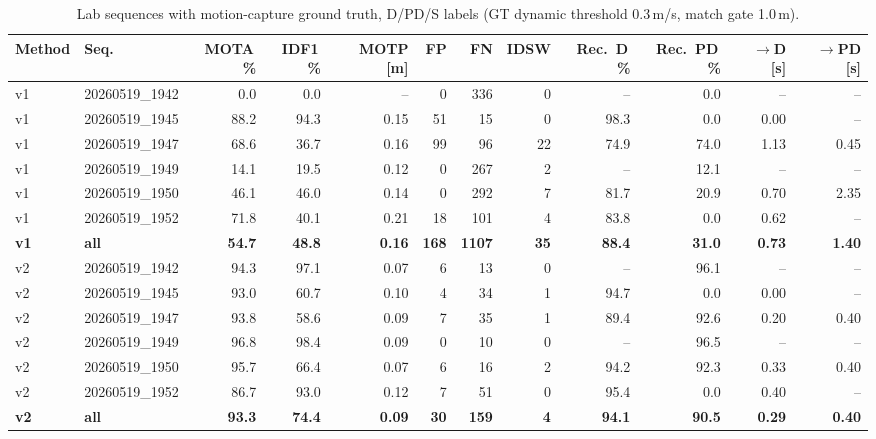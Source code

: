 \begin{table}[t]
\centering
\caption{Lab sequences with motion-capture ground truth, D/PD/S labels (GT dynamic threshold 0.3\,m/s, match gate 1.0\,m).}
\label{tab:own_mocap_full}
\setlength{\tabcolsep}{3pt}
\begin{tabular}{llrrrrrrrrrr}
\toprule
Method & Seq. & MOTA\,\% & IDF1\,\% & MOTP [m] & FP & FN & IDSW & Rec.\ D\,\% & Rec.\ PD\,\% & $\to$D [s] & $\to$PD [s] \\
\midrule
v1 & 20260519\_1942 & 0.0 & 0.0 & -- & 0 & 336 & 0 & -- & 0.0 & -- & -- \\
v1 & 20260519\_1945 & 88.2 & 94.3 & 0.15 & 51 & 15 & 0 & 98.3 & 0.0 & 0.00 & -- \\
v1 & 20260519\_1947 & 68.6 & 36.7 & 0.16 & 99 & 96 & 22 & 74.9 & 74.0 & 1.13 & 0.45 \\
v1 & 20260519\_1949 & 14.1 & 19.5 & 0.12 & 0 & 267 & 2 & -- & 12.1 & -- & -- \\
v1 & 20260519\_1950 & 46.1 & 46.0 & 0.14 & 0 & 292 & 7 & 81.7 & 20.9 & 0.70 & 2.35 \\
v1 & 20260519\_1952 & 71.8 & 40.1 & 0.21 & 18 & 101 & 4 & 83.8 & 0.0 & 0.62 & -- \\
\textbf{v1} & \textbf{all} & \textbf{54.7} & \textbf{48.8} & \textbf{0.16} & \textbf{168} & \textbf{1107} & \textbf{35} & \textbf{88.4} & \textbf{31.0} & \textbf{0.73} & \textbf{1.40} \\
\midrule
v2 & 20260519\_1942 & 94.3 & 97.1 & 0.07 & 6 & 13 & 0 & -- & 96.1 & -- & -- \\
v2 & 20260519\_1945 & 93.0 & 60.7 & 0.10 & 4 & 34 & 1 & 94.7 & 0.0 & 0.00 & -- \\
v2 & 20260519\_1947 & 93.8 & 58.6 & 0.09 & 7 & 35 & 1 & 89.4 & 92.6 & 0.20 & 0.40 \\
v2 & 20260519\_1949 & 96.8 & 98.4 & 0.09 & 0 & 10 & 0 & -- & 96.5 & -- & -- \\
v2 & 20260519\_1950 & 95.7 & 66.4 & 0.07 & 6 & 16 & 2 & 94.2 & 92.3 & 0.33 & 0.40 \\
v2 & 20260519\_1952 & 86.7 & 93.0 & 0.12 & 7 & 51 & 0 & 95.4 & 0.0 & 0.40 & -- \\
\textbf{v2} & \textbf{all} & \textbf{93.3} & \textbf{74.4} & \textbf{0.09} & \textbf{30} & \textbf{159} & \textbf{4} & \textbf{94.1} & \textbf{90.5} & \textbf{0.29} & \textbf{0.40} \\
\bottomrule
\end{tabular}
\end{table}
